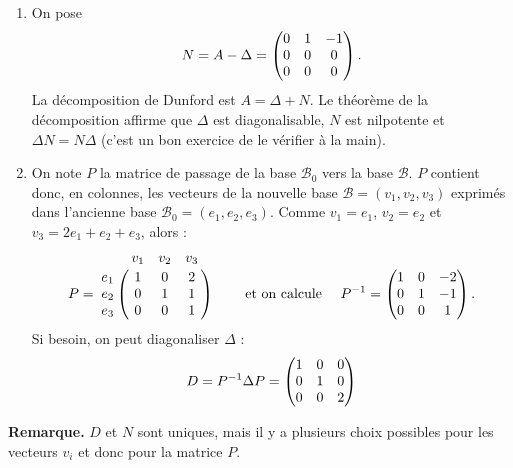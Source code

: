 \documentclass[12pt, class=report,crop=false]{standalone}
\begin{document}
\begin{exemple}
\begin{enumerate}
  \item  On pose 
  $$N = A - \Delta
  = \begin{pmatrix}0&1&-1\cr 0&0&0\cr 0&0&0\end{pmatrix}.$$
  La décomposition de Dunford est $A = \Delta + N$. 
  Le théorème de la décomposition affirme que $\Delta$ est diagonalisable,
  $N$ est nilpotente et $\Delta N = N \Delta$ (c'est un bon exercice de le vérifier
  à la main).
  
  \item On note $P$ la matrice de passage de la base $\mathcal{B}_0$ vers la base $\mathcal{B}$. $P$ contient donc, en colonnes, les vecteurs de la nouvelle base $\mathcal{B} = (v_1,v_2,v_3)$ exprimés dans l'ancienne base 
 $\mathcal{B}_0 = (e_1,e_2,e_3)$.  Comme
 $v_1 = e_1$, $v_2 = e_2$ et $v_3 =  2e_1+e_2+e_3$, alors :
 $$P=\bordermatrix{
    &v_1&v_2&v_3\cr
 e_1&1&0&2\cr  
 e_2&0&1&1\cr 
 e_3&0&0&1}\qquad \text{ et on calcule } \quad P^{-1}=\begin{pmatrix}1&0&-2\cr 0&1&-1\cr 0&0&1\end{pmatrix}.$$
 Si besoin, on peut diagonaliser $\Delta$ : 
 $$D = P^{-1} \Delta P = \begin{pmatrix}1&0&0\cr 0&1&0\cr 0&0&2\end{pmatrix}$$
 
\end{enumerate}
\end{exemple}


\textbf{Remarque.} $D$ et $N$ sont uniques, mais il y a plusieurs choix possibles pour les  vecteurs $v_i$ et donc pour la matrice $P$.


\bigskip
\end{document}
